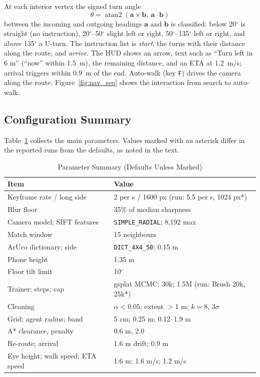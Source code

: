 \documentclass[conference]{IEEEtran}
\begin{document}
At each interior vertex the signed turn angle
\begin{equation}
\theta = \operatorname{atan2}\!\left(\mathbf{a}\times\mathbf{b},\ \mathbf{a}\cdot\mathbf{b}\right)
\end{equation}
between the incoming and outgoing headings $\mathbf{a}$ and $\mathbf{b}$ is classified: below 20$^{\circ}$ is straight (no instruction), 20$^{\circ}$--50$^{\circ}$ slight left or right, 50$^{\circ}$--135$^{\circ}$ left or right, and above 135$^{\circ}$ a U-turn. The instruction list is \emph{start}, the turns with their distance along the route, and \emph{arrive}. The HUD shows an arrow, text such as ``Turn left in 6 m'' (``now'' within 1.5~m), the remaining distance, and an ETA at 1.2~m/s; arrival triggers within 0.9~m of the end. Auto-walk (key \texttt{F}) drives the camera along the route. Figure~\ref{fig:nav_seq} shows the interaction from search to auto-walk.

\subsection{Configuration Summary}
Table~\ref{tab:model_config} collects the main parameters. Values marked with an asterisk differ in the reported runs from the defaults, as noted in the text.

\begin{table}[!htb]
\centering
\footnotesize
\caption{Parameter Summary (Defaults Unless Marked)}
\label{tab:model_config}
\begin{tabular}{p{}p{}}
\toprule
\textbf{Item} & \textbf{Value} \\
\midrule
Keyframe rate / long side & 2 per s / 1600 px (run: 5.5 per s, 1024 px*) \\
Blur floor & 35\% of median sharpness \\
Camera model; SIFT features & \texttt{SIMPLE\_RADIAL}; 8,192 max \\
Match window & 15 neighbours \\
ArUco dictionary; side & \texttt{DICT\_4X4\_50}; 0.15 m \\
Phone height & 1.35 m \\
Floor tilt limit & 10$^{\circ}$ \\
Trainer; steps; cap & gsplat MCMC; 30k; 1.5M (run: Brush 20k, 25k*) \\
Cleaning & $\alpha{<}0.05$; extent $>$1 m; $k{=}8$, $3\sigma$ \\
Grid; agent radius; band & 5 cm; 0.25 m; 0.12--1.9 m \\
A* clearance, penalty & 0.6 m, 2.0 \\
Re-route; arrival & 1.6 m drift; 0.9 m \\
Eye height; walk speed; ETA speed & 1.6 m; 1.6 m/s; 1.2 m/s \\
\bottomrule
\end{tabular}
\end{table}
\end{document}
